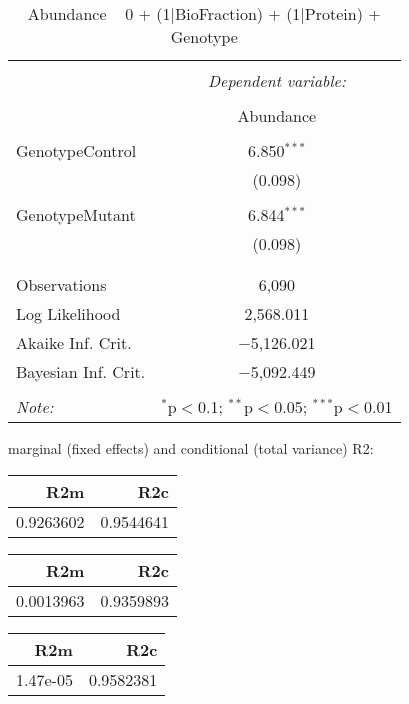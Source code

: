 \documentclass[11pt]{report}
\begin{document}
\begin{table}[!htbp] \centering 
  \caption{Abundance ~ 0 + (1|BioFraction) + (1|Protein) + Genotype} 
  \label{} 
\begin{tabular}{@{\extracolsep{5pt}}lc} 
\\[-1.8ex]\hline 
\hline \\[-1.8ex] 
 & \multicolumn{1}{c}{\textit{Dependent variable:}} \\ 
\cline{2-2} 
\\[-1.8ex] & Abundance \\ 
\hline \\[-1.8ex] 
 GenotypeControl & 6.850$^{***}$ \\ 
  & (0.098) \\ 
  & \\ 
 GenotypeMutant & 6.844$^{***}$ \\ 
  & (0.098) \\ 
  & \\ 
\hline \\[-1.8ex] 
Observations & 6,090 \\ 
Log Likelihood & 2,568.011 \\ 
Akaike Inf. Crit. & $-$5,126.021 \\ 
Bayesian Inf. Crit. & $-$5,092.449 \\ 
\hline 
\hline \\[-1.8ex] 
\textit{Note:}  & \multicolumn{1}{r}{$^{*}$p$<$0.1; $^{**}$p$<$0.05; $^{***}$p$<$0.01} \\ 
\end{tabular} 
\end{table} 
marginal (fixed effects) and conditional (total variance) R2:

\begin{tabular}{r|r}
\hline
R2m & R2c\\
\hline
0.9263602 & 0.9544641\\
\hline
\end{tabular}

\begin{tabular}{r|r}
\hline
R2m & R2c\\
\hline
0.0013963 & 0.9359893\\
\hline
\end{tabular}

\begin{tabular}{r|r}
\hline
R2m & R2c\\
\hline
1.47e-05 & 0.9582381\\
\hline
\end{tabular}
\end{document}
